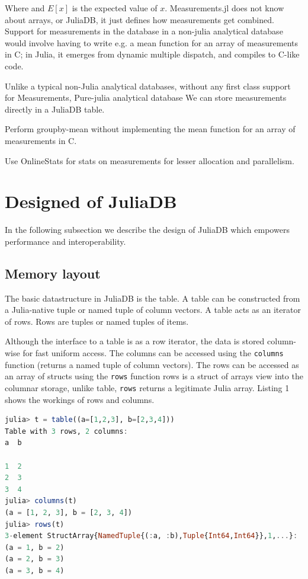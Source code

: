 \documentclass{juliacon}
\begin{document}
Where and $E[x]$ is the expected value of $x$.
Measurements.jl does not know about arrays, or JuliaDB, it just
defines how measurements get combined. Support for
measurements in the database in a non-julia analytical database
would involve having to write e.g. a mean function for an array
of measurements in C; in Julia, it emerges from dynamic
multiple dispatch, and compiles to C-like code.

Unlike a typical non-Julia analytical databases, without any
first class support for Measurements,
Pure-julia analytical database
We can store measurements directly in a JuliaDB table.

Perform groupby-mean without implementing the
mean function for an array of measurements in C.

Use OnlineStats for stats on measurements for lesser
allocation and parallelism.

\section{Designed of JuliaDB}

In the following subsection we describe the design of JuliaDB which empowers performance and interoperability.

\subsection{Memory layout}

The basic datastructure in JuliaDB is the table. A table can be constructed
from a Julia-native tuple or named tuple of column vectors. A table
acts as an iterator of rows. Rows are tuples or named tuples of items. 

Although the interface to a table is as a row iterator, the data is
stored column-wise for fast uniform access. The columns can be accessed
using the \texttt{columns} function (returns a named tuple of column
vectors). The rows can be accessed as an array of structs using the
\texttt{rows} function rows is a struct of arrays view into the columnar
storage, unlike table, \texttt{rows} returns a legitimate Julia array.
Listing 1 shows the workings of rows and columns.
\begin{lstlisting}[language=Julia]
julia> t = table((a=[1,2,3], b=[2,3,4]))
Table with 3 rows, 2 columns:
a  b

1  2
2  3
3  4
julia> columns(t)
(a = [1, 2, 3], b = [2, 3, 4])
julia> rows(t)
3-element StructArray{NamedTuple{(:a, :b),Tuple{Int64,Int64}},1,...}:
(a = 1, b = 2)
(a = 2, b = 3)
(a = 3, b = 4) 
\end{lstlisting}
\end{document}
